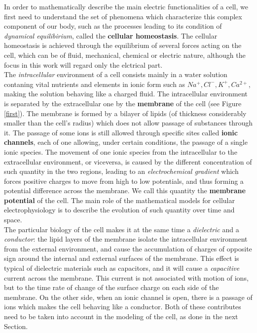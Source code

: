 \documentclass[12pt, a4paper]{report}
\begin{document}
In order to mathematically describe the main electric functionalities of a cell, we first need to understand the set of phenomena which characterize this complex component of our body, such as the processes leading to its condition of \textit{dynamical equilibirium}, called the \textbf{cellular homeostasis}. The cellular homeostasis is achieved through the equilibrium of several forces acting on the cell, which can be of fluid, mechanical, chemical or electric nature, although the focus in this work will regard only the elctrical part.\\
The \textit{intracellular} environment of a cell consists mainly in a water solution contaning vital nutrients and elements in ionic form such as  $Na^+, Cl^-, K^+, Ca^{2+}$, making the solution behaving like a charged fluid. The intracellular environment is separated by the extracellular one by the \textbf{membrane} of the cell (see Figure \ref{first}). The membrane is formed by a bilayer of lipids (of thickness considerably smaller than the cell's radius) which does not allow passage of substances through it. The passage of some ions is still allowed through specific sites called \textbf{ionic channels}, each of one allowing, under certain conditions, the passage of a single ionic species. The movement of one ionic species from the intracellular to the extracellular environment, or viceversa, is caused by the different concentration of such quantity in the two regions, leading to an \textit{electrochemical gradient} which forces positive charges to move from high to low potentials, and thus forming a potential difference across the membrane. We call this quantity the \textbf{membrane potential} of the cell. The main role of the mathematical models for cellular electrophysiology is to describe the evolution of such quantity over time and space.
\\

The particular biology of the cell makes it at the same time a \textit{dielectric} and a \textit{conductor}: the lipid layers of the membrane isolate the intracellular environment from the external environment, and cause the accumulation of charges of opposite sign around the internal and external surfaces of the membrane. This effect is typical of dielectric materials such as capacitors, and it will cause a \textit{capacitive} current across the membrane. This current is not associated with motion of ions, but to the time rate of change of the surface charge on each side of the membrane. On the other side, when an ionic channel is open, there is a passage of ions which makes the cell behaving like a conductor. Both of these contributes need to be taken into account in the modeling of the cell, as done in the next Section.
\\
\end{document}

